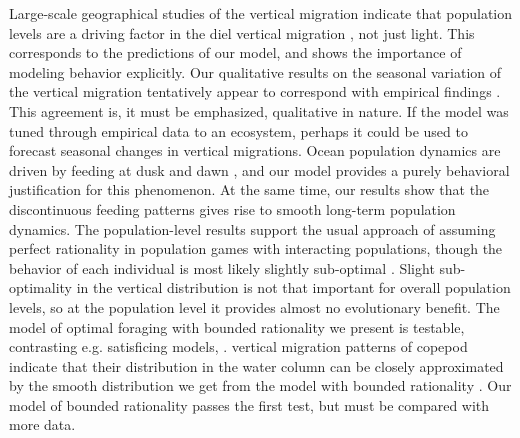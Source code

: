 
Large-scale geographical studies of the vertical migration indicate that population levels are a driving factor in the diel vertical migration \citep{klevjer2016large}, not just light. This corresponds to the predictions of our model, and shows the importance of modeling behavior explicitly. Our qualitative results on the seasonal variation of the vertical migration tentatively appear to correspond with empirical findings \citep{wang2014seasonal, beaugrand2001geographical, colebrook1979continuous}. This agreement is, it must be emphasized, qualitative in nature. If the model was tuned through empirical data to an ecosystem, perhaps it could be used to forecast seasonal changes in vertical migrations.
Ocean population dynamics are driven by feeding at dusk and dawn \citep{benoit2014critical}, and our model provides a purely behavioral justification for this phenomenon. At the same time, our results show that the discontinuous feeding patterns gives rise to smooth long-term population dynamics. The population-level results support the usual approach of assuming perfect rationality in population games with interacting populations, though the behavior of each individual is most likely slightly sub-optimal \citep{hurly1999context}. Slight sub-optimality in the vertical distribution is not that important for overall population levels, so at the population level it provides almost no evolutionary benefit.
The model of optimal foraging with bounded rationality we present is testable,  contrasting e.g. satisficing models, \citep{nonacs1993satisficing}.  vertical migration patterns of copepod indicate that their distribution in the water column can be closely approximated by the smooth distribution we get from the model with bounded rationality \citep{hay1991zooplankton, visser2001observations}. Our model of bounded rationality passes the first test, but must be compared with more data.

